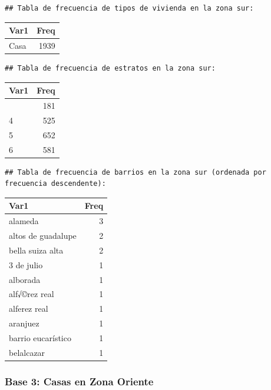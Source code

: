 \documentclass[
]{article}
\begin{document}
\begin{verbatim}
## Tabla de frecuencia de tipos de vivienda en la zona sur:
\end{verbatim}

\begin{longtable}[]{@{}lr@{}}
\toprule\noalign{}
Var1 & Freq \\
\midrule\noalign{}
\endhead
\bottomrule\noalign{}
\endlastfoot
Casa & 1939 \\
\end{longtable}

\begin{verbatim}
## Tabla de frecuencia de estratos en la zona sur:
\end{verbatim}

\begin{longtable}[]{@{}lr@{}}
\toprule\noalign{}
Var1 & Freq \\
\midrule\noalign{}
\endhead
\bottomrule\noalign{}
\endlastfoot
3 & 181 \\
4 & 525 \\
5 & 652 \\
6 & 581 \\
\end{longtable}

\begin{verbatim}
## Tabla de frecuencia de barrios en la zona sur (ordenada por frecuencia descendente):
\end{verbatim}

\begin{longtable}[]{@{}lr@{}}
\toprule\noalign{}
Var1 & Freq \\
\midrule\noalign{}
\endhead
\bottomrule\noalign{}
\endlastfoot
alameda & 3 \\
altos de guadalupe & 2 \\
bella suiza alta & 2 \\
3 de julio & 1 \\
alborada & 1 \\
alf√©rez real & 1 \\
alferez real & 1 \\
aranjuez & 1 \\
barrio eucarístico & 1 \\
belalcazar & 1 \\
\end{longtable}

\subsubsection{\texorpdfstring{\textbf{Base 3: Casas en Zona
Oriente}}{Base 3: Casas en Zona Oriente}}\label{base-3-casas-en-zona-oriente}
\end{document}
